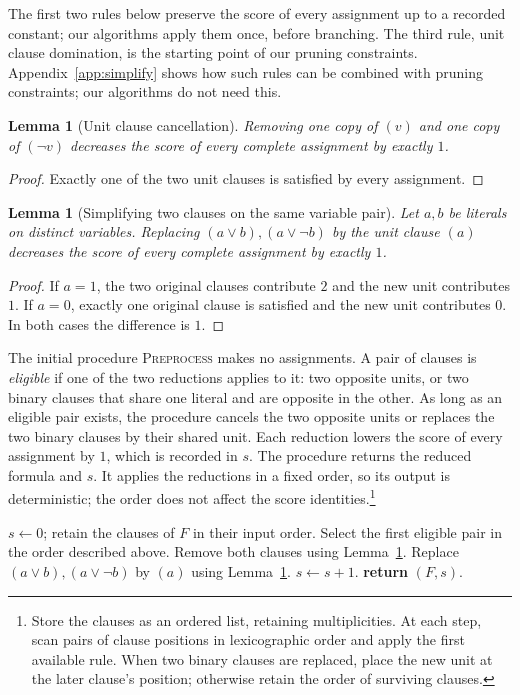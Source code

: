 \documentclass[11pt,a4paper]{article}
\newtheorem{lemma}[theorem]{Lemma}
\theoremstyle{definition}
\theoremstyle{remark}
\begin{document}
The first two rules below preserve the score of every assignment up to a
recorded constant; our algorithms apply them once, before branching. The
third rule, unit clause domination, is the starting point of our pruning
constraints. Appendix~\ref{app:simplify} shows how such rules can be
combined with pruning constraints; our algorithms do not need this.

\begin{lemma}[Unit clause cancellation]\label{lem:unit_canc}
Removing one copy of $(v)$ and one copy of $(\neg v)$ decreases the score
of every complete assignment by exactly $1$.
\end{lemma}
\begin{proof}
Exactly one of the two unit clauses is satisfied by every assignment.
\end{proof}

\begin{lemma}[Simplifying two clauses on the same variable pair]\label{lem:simplify}
Let $a,b$ be literals on distinct variables. Replacing
$(a\vee b),(a\vee\neg b)$ by the unit clause $(a)$ decreases the score of
every complete assignment by exactly $1$.
\end{lemma}
\begin{proof}
If $a=1$, the two original clauses contribute $2$ and the new unit contributes
$1$. If $a=0$, exactly one original clause is satisfied and the new unit
contributes $0$. In both cases the difference is $1$.
\end{proof}

The initial procedure \textnormal{\textsc{Preprocess}} makes no assignments.
A pair of clauses is \emph{eligible} if one of the two reductions applies
to it: two opposite units, or two binary clauses that share one literal
and are opposite in the other. As long as an eligible pair exists, the
procedure cancels the two opposite units or replaces the two binary
clauses by their shared unit. Each reduction lowers the
score of every assignment by $1$, which is recorded in $s$. The procedure returns the
reduced formula and $s$. It applies the reductions in a fixed order, so
its output is deterministic; the order does not affect the score
identities.\footnote{Store the clauses as an ordered list, retaining
multiplicities. At each step, scan pairs of clause positions in
lexicographic order and apply the first available rule. When two binary
clauses are replaced, place the new unit at the later clause's position;
otherwise retain the order of surviving clauses.}

\begin{algorithm}[tp]
\caption{\textnormal{\textsc{Preprocess}}$(F)$}\label{alg:preprocess}
\begin{algorithmic}[1]
\STATE $s\gets0$; retain the clauses of $F$ in their input order.
  \STATE Select the first eligible pair in the order described above.
    \STATE Remove both clauses using Lemma~\ref{lem:unit_canc}.
  \ELSE
    \STATE Replace $(a\vee b),(a\vee\neg b)$ by $(a)$ using Lemma~\ref{lem:simplify}.
  \ENDIF
  \STATE $s\gets s+1$.
\ENDWHILE
\STATE \textbf{return} $(F,s)$.
\end{algorithmic}
\end{algorithm}
\end{document}
